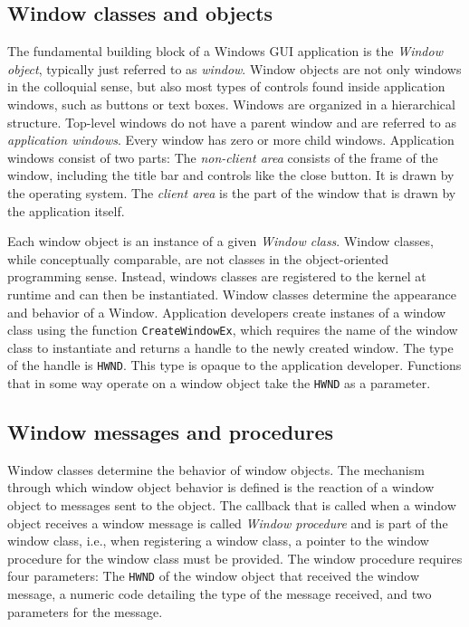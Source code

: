 \documentclass[10pt,twocolumn,a4paper]{article}
\begin{document}
		\subsection{Window classes and objects}
			The fundamental building block of a Windows GUI application is the
			\textit{Window object}, typically just referred to as \textit{window}.
			Window objects are not only windows in the colloquial sense, but also
			most types of controls found inside application windows, such as buttons
			or text boxes. Windows are organized in a hierarchical structure.
			Top-level windows do not have a parent window and are referred to as
			\textit{application windows}. Every window has zero or more child
			windows. Application windows consist of two parts: The \textit{non-client
			area} consists of the frame of the window, including the title bar and
			controls like the close button. It is drawn by the operating system.
			The \textit{client area} is the part of the window that is drawn by
			the application itself.
			\cite{whatiswindow}

			Each window object is an instance of a given \textit{Window class}.
			Window classes, while conceptually comparable, are not classes in
			the object-oriented programming sense. Instead, windows classes are
			registered to the kernel at runtime and can then be instantiated.
			Window classes determine the appearance and behavior of a Window.
			Application developers create instanes of a window class
			using the function
			\texttt{CreateWindowEx}, which requires the name of the window class
			to instantiate and returns a handle to the newly created window.
			The type of the handle is \texttt{HWND}. This type is opaque to the
			application developer. Functions that in some way operate on a
			window object take the \texttt{HWND} as a parameter.
			\cite{creatingwindow,whatiswindow}

		\subsection{Window messages and procedures} %
			Window classes determine the behavior of window objects. The mechanism
			through which window object behavior is defined is the reaction of
			a window object to messages sent to the object. The callback that
			is called when a window object receives a window message is called
			\textit{Window procedure} and is part of the window class, i.e., when
			registering a window class, a pointer to the window procedure for the
			window class must be provided. The window
			procedure requires four parameters: The \texttt{HWND} of the window
			object that received the window message, a numeric code detailing the
			type of the message received, and two parameters for the message.
			\cite{aboutwinproc}
\end{document}
